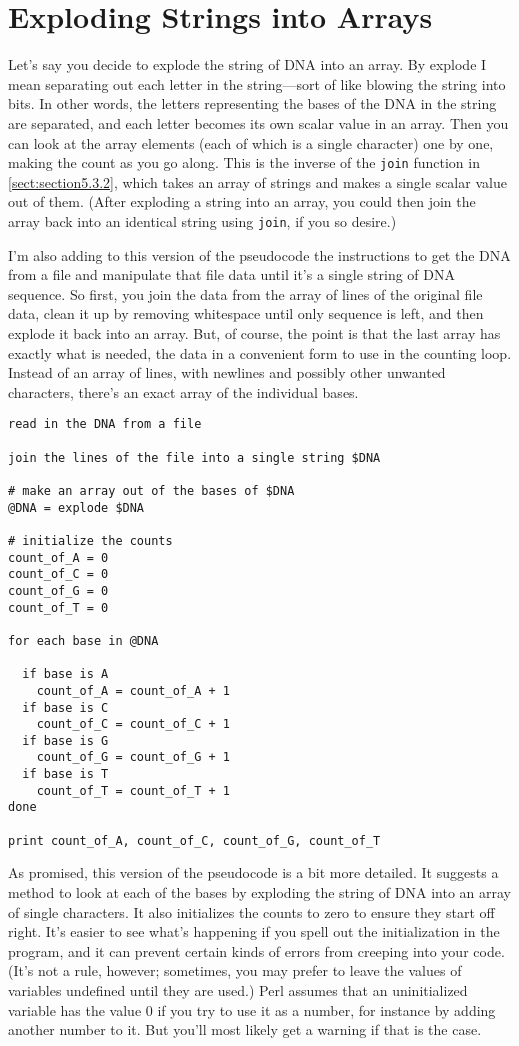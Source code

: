 \section{Exploding Strings into Arrays}
Let's say you decide to explode the string of DNA into an array. By explode I mean separating out each letter in the string—sort of like blowing the string into bits. In other words, the letters representing the bases of the DNA in the string are separated, and each letter becomes its own scalar value in an array. Then you can look at the array elements (each of which is a single character) one by one, making the count as you go along. This is the inverse of the \verb|join| function in \autoref{sect:section5.3.2}, which takes an array of strings and makes a single scalar value out of them. (After exploding a string into an array, you could then join the array back into an identical string using \verb|join|, if you so desire.)

I'm also adding to this version of the pseudocode the instructions to get the DNA from a file and manipulate that file data until it's a single string of DNA sequence. So first, you join the data from the array of lines of the original file data, clean it up by removing whitespace until only sequence is left, and then explode it back into an array. But, of course, the point is that the last array has exactly what is needed, the data in a convenient form to use in the counting loop. Instead of an array of lines, with newlines and possibly other unwanted characters, there's an exact array of the individual bases. 

\begin{lstlisting}
read in the DNA from a file

join the lines of the file into a single string $DNA

# make an array out of the bases of $DNA
@DNA = explode $DNA

# initialize the counts
count_of_A = 0
count_of_C = 0
count_of_G = 0
count_of_T = 0

for each base in @DNA

  if base is A
    count_of_A = count_of_A + 1
  if base is C
    count_of_C = count_of_C + 1
  if base is G
    count_of_G = count_of_G + 1
  if base is T
    count_of_T = count_of_T + 1
done

print count_of_A, count_of_C, count_of_G, count_of_T
\end{lstlisting}

As promised, this version of the pseudocode is a bit more detailed. It suggests a method to look at each of the bases by exploding the string of DNA into an array of single characters. It also initializes the counts to zero to ensure they start off right. It's easier to see what's happening if you spell out the initialization in the program, and it can prevent certain kinds of errors from creeping into your code. (It's not a rule, however; sometimes, you may prefer to leave the values of variables undefined until they are used.) Perl assumes that an uninitialized variable has the value 0 if you try to use it as a number, for instance by adding another number to it. But you'll most likely get a warning if that is the case.

